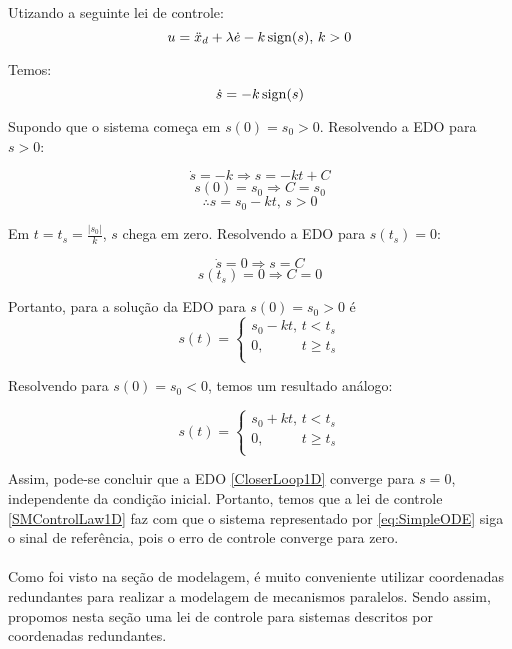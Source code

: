 Utizando a seguinte lei de controle:
\begin{equation} \label{SMControlLaw1D}
u = \ddot{x}_d + \lambda \dot{e} - k \operatorname*{sign} (s), \, k>0
\end{equation}

Temos:
\begin{equation} \label{CloserLoop1D}
\dot{s} = -k \operatorname*{sign}(s) 
\end{equation}

Supondo que o sistema come\c{c}a em $s(0) = s_0 >0$. Resolvendo a EDO para $s>0$:

$$ \dot{s} = -k \Rightarrow s = -k t + C $$
$$ s(0) = s_0 \Rightarrow C = s_0 $$
$$ \therefore s = s_0 - k t, \, s>0 $$

Em $t = t_s = \frac{|s_0|}{k}$, $s$ chega em zero. Resolvendo a EDO para $s(t_s) = 0$:

$$ \dot{s} = 0 \Rightarrow s =  C $$
$$ s(t_s) = 0 \Rightarrow C = 0 $$

Portanto, para a solu\c{c}\~ao da EDO para $s(0) = s_0 > 0$ é
\begin{equation} \label{eq:SM-ODE-Sol1}
s(t) =
\begin{cases}
s_0 - k t, \, t < t_s \\
0, \,\,\,\,\,\,\,\,\,\,\,\,\,\,\,\, t \geq t_s \\
\end{cases}
\end{equation}

Resolvendo para $s(0) = s_0 < 0$, temos um resultado an\'alogo:

\begin{equation} \label{eq:SM-ODE-Sol2}
s(t) =
\begin{cases}
s_0 + k t, \, t < t_s \\
0, \,\,\,\,\,\,\,\,\,\,\,\,\,\,\,\, t \geq t_s \\
\end{cases}
\end{equation}

Assim, pode-se concluir que a EDO \eqref{CloserLoop1D} converge para $s=0$, independente da condi\c{c}\~ao inicial. Portanto, temos que a lei de controle \eqref{SMControlLaw1D} faz com que o sistema representado por \eqref{eq:SimpleODE} siga o sinal de refer\^encia, pois o erro de controle converge para zero. \\

\\

Como foi visto na se\c{c}\~ao de modelagem, \'e muito conveniente utilizar coordenadas redundantes para realizar a modelagem de mecanismos paralelos. Sendo assim, propomos nesta se\c{c}\~ao uma lei de controle para sistemas descritos por coordenadas redundantes. \\
 
